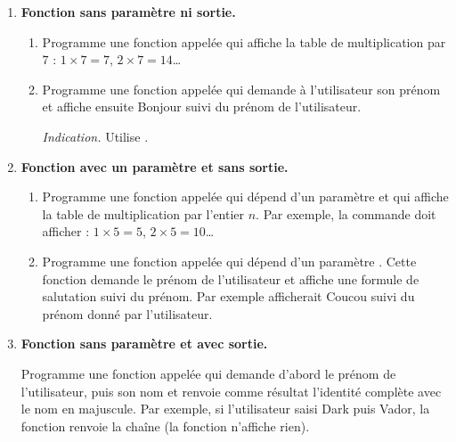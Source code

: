 \documentclass[11pt,class=report,crop=false]{standalone}
\begin{document}
\begin{cours}
\end{cours}



\begin{activite}

\begin{enumerate}
  \item \textbf{Fonction sans paramètre ni sortie.}
  \begin{enumerate}
    \item Programme une fonction appelée  qui affiche la table de multiplication par $7$ : $1 \times 7 = 7$, $2\times 7 = 14$\ldots
    
    \item Programme une fonction appelée  qui demande à l'utilisateur son prénom et affiche ensuite \og{}Bonjour\fg{} suivi du prénom de l'utilisateur.
    
    \emph{Indication.} Utilise .
  \end{enumerate}

  \item \textbf{Fonction avec un paramètre et sans sortie.}
  \begin{enumerate}
    \item Programme une fonction appelée  qui dépend d'un paramètre  et qui affiche la table de multiplication par l'entier $n$.
    Par exemple, la commande  doit afficher : $1 \times 5 = 5$, $2\times 5 = 10$\ldots
    
    \item Programme une fonction appelée  qui dépend d'un paramètre . Cette fonction demande le prénom de l'utilisateur et affiche une formule de salutation suivi du prénom. Par exemple  afficherait \og{}Coucou\fg{} suivi du prénom donné par l'utilisateur.
  \end{enumerate}  
  
  \item \textbf{Fonction sans paramètre et avec sortie.}
  
Programme une fonction appelée  qui demande d'abord le prénom de l'utilisateur, puis son nom et renvoie comme résultat l'identité complète avec le nom en majuscule. Par exemple, si l’utilisateur saisi \og{}Dark\fg{} puis \og{}Vador\fg{}, la fonction renvoie la chaîne  (la fonction n'affiche rien).


\end{enumerate}
\end{activite}
\end{document}
